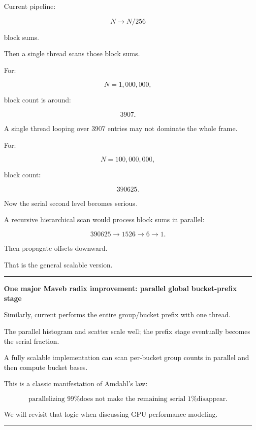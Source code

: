 Current pipeline:

\[
N
\rightarrow
N/256
\]

block sums.

Then a single thread scans those block sums.

For:

\[
N=1,000,000,
\]

block count is around:

\[
3907.
\]

A single thread looping over 3907 entries may not dominate the whole frame.

For:

\[
N=100,000,000,
\]

block count:

\[
390625.
\]

Now the serial second level becomes serious.

A recursive hierarchical scan would process block sums in parallel:

\[
390625
\rightarrow
1526
\rightarrow
6
\rightarrow
1.
\]

Then propagate offsets downward.

That is the general scalable version.

\begin{center}\rule{0.5\linewidth}{0.5pt}\end{center}

\textbf{One major Maveb radix improvement: parallel global bucket-prefix stage}

Similarly, current  performs the entire group/bucket prefix with one thread.

The parallel histogram and scatter scale well; the prefix stage eventually becomes the serial fraction.

A fully scalable implementation can scan per-bucket group counts in parallel and then compute bucket bases.

This is a classic manifestation of Amdahl's law:

\[
\boxed{
\text{parallelizing 99\% does not make the remaining serial 1\% disappear}.
}
\]

We will revisit that logic when discussing GPU performance modeling.

\begin{center}\rule{0.5\linewidth}{0.5pt}\end{center}

